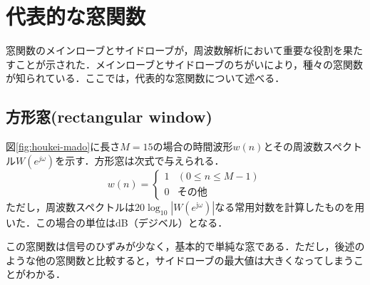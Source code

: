 \section{代表的な窓関数}

窓関数のメインローブとサイドローブが，周波数解析において重要な役割を果たすことが示された．メインローブとサイドローブのちがいにより，種々の窓関数が知られている．ここでは，代表的な窓関数について述べる．


\subsection{方形窓(rectangular window)}

図\ref{fig:houkei-mado}に長さ$M=15$の場合の時間波形$w(n)$とその周波数スペクトル$W(e^{j\omega})$を示す．方形窓は次式で与えられる．
\begin{equation}
w(n)= \left \{
\begin{array}{ll}
1 & (0 \leq n \leq M-1) \\
0 & その他
\end{array}
\right .
\end{equation}
ただし，周波数スペクトルは$20\log_{10} | W (e^{\textrm{j}\omega})|$なる常用対数を計算したものを用いた．この場合の単位はdB（デジベル）となる．

この窓関数は信号のひずみが少なく，基本的で単純な窓である．ただし，後述のような他の窓関数と比較すると，サイドローブの最大値は大きくなってしまうことがわかる．


